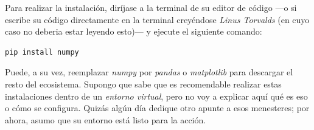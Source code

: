 Para realizar la instalación, diríjase a la terminal de su editor de código —o si escribe su código directamente en la terminal creyéndose \textit{Linus Torvalds} (en cuyo caso no deberia estar leyendo esto)— y ejecute el siguiente comando:

\begin{verbatim}
pip install numpy
\end{verbatim}

Puede, a su vez, reemplazar \textit{numpy} por \textit{pandas} o \textit{matplotlib} para descargar el resto del ecosistema. Supongo que sabe que es recomendable realizar estas instalaciones dentro de un \textit{entorno virtual}, pero no voy a explicar aquí qué es eso o cómo se configura. Quizás algún día dedique otro apunte a esos menesteres; por ahora, asumo que su entorno está listo para la acción.